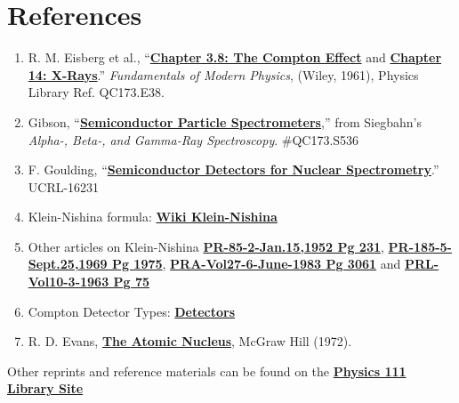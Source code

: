 \documentclass{../lab}
\begin{document}
\section{References}
\label{sec:References}

\begin{enumerate}
    \item R. M. Eisberg et al., ``\href{http://physics111.lib.berkeley.edu/Physics111/Reprints/COM/Ch.\%203.8\%20The\%20compton\%20effect\%20pg\%2081-86.pdf}{\textbf{Chapter 3.8: The Compton Effect}} and \href{http://physics111.lib.berkeley.edu/Physics111/Reprints/COM/Ch.\%2014\%20X-rays.pdf}{\textbf{Chapter 14: X-Rays}}.'' \emph{Fundamentals of Modern Physics}, (Wiley, 1961), Physics Library Ref. QC173.E38.

    \item Gibson, ``\href{http://physics111.lib.berkeley.edu/Physics111/Reprints/COM/02-Semiconductor\_Particle\_Spectrometers.pdf}{\textbf{Semiconductor Particle Spectrometers}},'' from Siegbahn's \emph{Alpha-, Beta-, and Gamma-Ray Spectroscopy}. \#QC173.S536

    \item F. Goulding, ``\href{http://physics111.lib.berkeley.edu/Physics111/Reprints/COM/COM\_Detectors/01-UCRL-16231.pdf}{\textbf{Semiconductor Detectors for Nuclear Spectrometry}}.'' UCRL-16231

    \item Klein-Nishina formula: \href{http://physics111.lib.berkeley.edu/Physics111/Reprints/COM/Klein\_Nishina-Wiki.pdf}{\textbf{Wiki Klein-Nishina}}

    \item Other articles on Klein-Nishina \href{http://physics111.lib.berkeley.edu/Physics111/Reprints/COM/Klein\%20Nishina-p231\_1.pdf}{\textbf{PR-85-2-Jan.15,1952 Pg 231}}, \href{http://physics111.lib.berkeley.edu/Physics111/Reprints/COM/Klein\%20Nishina-p1975\_1.pdf}{\textbf{PR-185-5-Sept.25,1969 Pg 1975}}, \href{http://physics111.lib.berkeley.edu/Physics111/Reprints/COM/Klein\%20Nishina-p3061\_1.pdf}{\textbf{PRA-Vol27-6-June-1983 Pg 3061}} and \href{http://physics111.lib.berkeley.edu/Physics111/Reprints/COM/Klein\%20Nishina\_p75\_1.pdf}{\textbf{PRL-Vol10-3-1963 Pg 75}}

    \item Compton Detector Types: \href{http://physics111.lib.berkeley.edu/Physics111/Reprints/COM/COM\_index.html}{\textbf{Detectors}}

    \item R. D. Evans, \href{http://physics111.lib.berkeley.edu/Physics111/Reprints/R.D.Evans\%20Atomic\%20Nucleus/The\%20Atomic\%20Nucleus\%20Evans\%20full\%20text.pdf}{\textbf{The Atomic Nucleus}}, McGraw Hill (1972).

\end{enumerate}

Other reprints and reference materials can be found on the \href{http://physics111.lib.berkeley.edu/Physics111/Reprints/COM/COM\_index.html}{\textbf{Physics 111 Library Site}}
\end{document}
